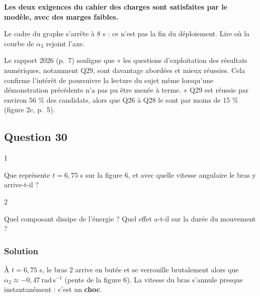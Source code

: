 \documentclass[11pt,a4paper]{article}
\begin{document}
\textbf{Les deux exigences du cahier des charges sont satisfaites par le modèle, avec des marges faibles.}

\begin{piege}

Le cadre du graphe s'arrête à 8 s : ce n'est pas la fin du déploiement. Lire où la courbe de \(\alpha_3\) rejoint l'axe.

\end{piege}

\begin{jury}

Le rapport 2026 (p.~7) souligne que « les questions d'exploitation des résultats numériques, notamment Q29, sont davantage abordées et mieux réussies. Cela confirme l'intérêt de poursuivre la lecture du sujet même lorsqu'une démonstration précédente n'a pas pu être menée à terme. » Q29 est réussie par environ 56 \% des candidats, alors que Q26 à Q28 le sont par moins de 15 \% (figure 2c, p.~5).

\end{jury}

\hypertarget{question-30}{%
\subsection{Question 30}\label{question-30}}

\begin{indication}{1}

Que représente \(t=6{,}75\) s sur la figure 6, et avec quelle vitesse angulaire le bras y arrive-t-il ?

\end{indication}

\begin{indication}{2}

Quel composant dissipe de l'énergie ? Quel effet a-t-il sur la durée du mouvement ?

\end{indication}

\hypertarget{solution-29}{%
\subsubsection{Solution}\label{solution-29}}

À \(t=6{,}75\) s, le bras 2 arrive en butée et se verrouille brutalement alors que \(\dot\alpha_2\approx-0{,}47\ \mathrm{rad\,s^{-1}}\) (pente de la figure 6). La vitesse du bras s'annule presque instantanément : c'est un \textbf{choc}.
\end{document}
